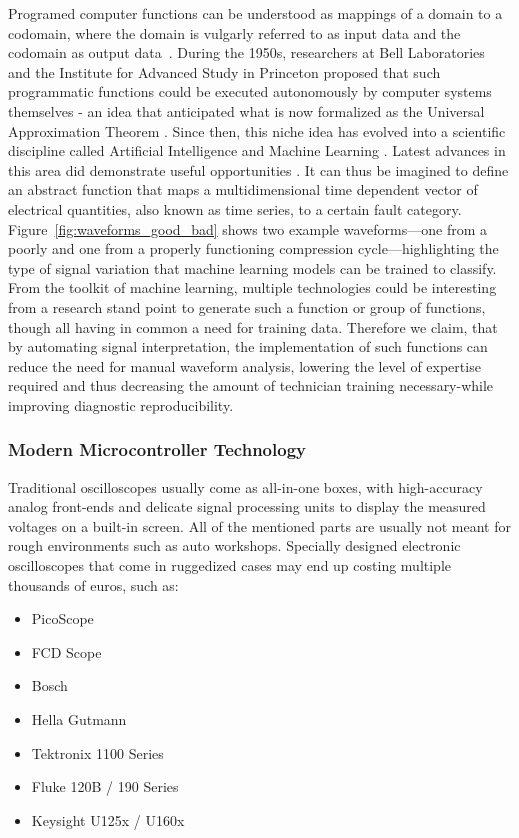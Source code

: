 \documentclass[conference,a4paper]{IEEEtran}
\begin{document}
Programed computer functions can be understood as mappings of a domain to a codomain, where the domain is vulgarly referred to as input data and the codomain as output data~\cite{knuth71, wirth76}. 
During the 1950s, researchers at Bell Laboratories and the Institute for Advanced Study in Princeton proposed that such programmatic functions could be executed autonomously by computer systems themselves 
- an idea that anticipated what is now formalized as the Universal Approximation Theorem  \cite{Cybenko1989, Hornik1991}. 
Since then, this niche idea has evolved into a scientific discipline called Artificial Intelligence and Machine Learning \cite{RussellNorvig2020, Goodfellow2016}. 
Latest advances in this area did demonstrate useful opportunities \cite{LeCun2015, Silver2016}. 
It can thus be imagined to define an abstract function that maps a multidimensional time dependent vector of electrical quantities, also known as time series, to a certain fault category. 
Figure~\ref{fig:waveforms_good_bad} shows two example waveforms—one from a poorly and one from a properly functioning compression cycle—highlighting the type of signal variation that machine learning models can be trained to classify.
From the toolkit of machine learning, multiple technologies could be interesting from a research stand point to generate such a function or group of functions, though all having in common a need for training data. 
Therefore we claim, that by automating signal interpretation, the implementation of such functions can reduce the need for manual waveform analysis, 
lowering the level of expertise required and thus decreasing the amount of technician training necessary-while improving diagnostic reproducibility.

\subsubsection{Modern Microcontroller Technology}
Traditional oscilloscopes usually come as all-in-one boxes, with high-accuracy analog front-ends and delicate signal processing units to display the measured voltages on a built-in screen. 
All of the mentioned parts are usually not meant for rough environments such as auto workshops. 
Specially designed electronic oscilloscopes that come in ruggedized cases may end up costing multiple thousands of euros, such as:
\begin{itemize}
    \item PicoScope
    \item FCD Scope
    \item Bosch
    \item Hella Gutmann
    \item Tektronix 1100 Series
    \item Fluke 120B / 190 Series
    \item Keysight U125x / U160x
\end{itemize}
\end{document}
